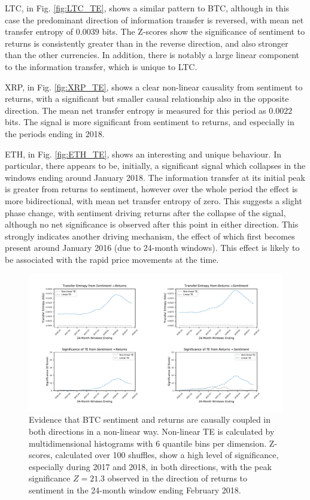 \documentclass[]{rsos}%
\begin{document}
{  LTC, in Fig. \ref{fig:LTC_TE}, shows a similar pattern to BTC, although in this case the predominant direction of information transfer is reversed, with mean net transfer entropy of $0.0039$ bits. The Z-scores show the significance of sentiment to returns is consistently greater than in the reverse direction, and also stronger than the other currencies. In addition, there is notably a large linear component to the information transfer, which is unique to LTC. 

  XRP, in Fig. \ref{fig:XRP_TE}, shows a clear non-linear causality from sentiment to returns, with a significant but smaller causal relationship also in the opposite direction. The mean net transfer entropy is measured for this period as $0.0022$ bits. The signal is more significant from sentiment to returns, and especially in the periods ending in 2018. 
  
  ETH, in Fig. \ref{fig:ETH_TE}, shows an interesting and unique behaviour. In particular, there appears to be, initially, a significant signal which collapses in the windows ending around January 2018. The information transfer at its initial peak is greater from returns to sentiment, however over the whole period the effect is more bidirectional, with mean net transfer entropy of zero. This suggests a slight phase change, with sentiment driving returns after the collapse of the signal, although no net significance is observed after this point in either direction. This strongly indicates another driving mechanism, the effect of which first becomes present around January 2016 (due to 24-month windows). This effect is likely to be associated with the rapid price movements at the time.  
  
  \begin{figure}[!htbp]
    \includegraphics[width=\linewidth]{images/BTC.pdf}
    \caption{Evidence that BTC sentiment and returns are causally coupled in both directions in a non-linear way. Non-linear TE is calculated by multidimensional histograms with 6 quantile bins per dimension. Z-scores, calculated over 100 shuffles, show a high level of significance, especially during 2017 and 2018, in both directions, with the peak significance $Z=21.3$ observed in the direction of returns to sentiment in the 24-month window ending February 2018.}
    \label{fig:BTC_TE}
  

\end{figure}}
\end{document}
